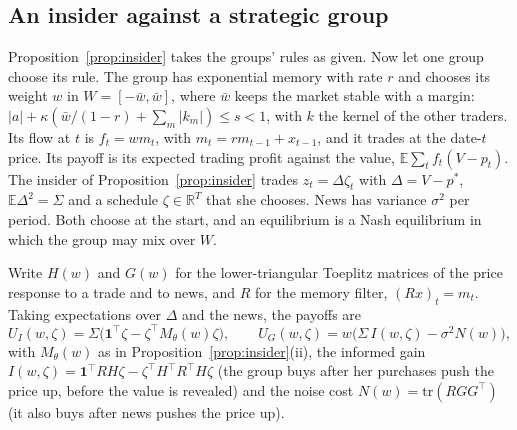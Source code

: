 \documentclass[12pt]{article}
\theoremstyle{definition}
\theoremstyle{remark}
\begin{document}
\subsection{An insider against a strategic group}

Proposition~\ref{prop:insider} takes the groups' rules as given. Now let one group choose its rule. The group has exponential memory with rate $r$ and chooses its weight $w$ in $W=[-\bar w,\bar w]$, where $\bar w$ keeps the market stable with a margin: $|a|+\kappa(\bar w/(1-r)+\sum_m|k_m|)\le s<1$, with $k$ the kernel of the other traders. Its flow at $t$ is $f_t=wm_t$, with $m_t=rm_{t-1}+x_{t-1}$, and it trades at the date-$t$ price. Its payoff is its expected trading profit against the value, $\mathbb E\sum_tf_t(V-p_t)$. The insider of Proposition~\ref{prop:insider} trades $z_t=\Delta\zeta_t$ with $\Delta=V-p^*$, $\mathbb E\Delta^2=\Sigma$ and a schedule $\zeta\in\mathbb R^T$ that she chooses. News has variance $\sigma^2$ per period. Both choose at the start, and an equilibrium is a Nash equilibrium in which the group may mix over $W$.

Write $H(w)$ and $G(w)$ for the lower-triangular Toeplitz matrices of the price response to a trade and to news, and $R$ for the memory filter, $(R x)_t=m_t$. Taking expectations over $\Delta$ and the news, the payoffs are
\[
U_I(w,\zeta)=\Sigma\bigl(\mathbf 1^\top\zeta-\zeta^\top M_\theta(w)\zeta\bigr),\qquad
U_G(w,\zeta)=w\bigl(\Sigma\,I(w,\zeta)-\sigma^2N(w)\bigr),
\]
with $M_\theta(w)$ as in Proposition~\ref{prop:insider}(ii), the informed gain $I(w,\zeta)=\mathbf 1^\top RH\zeta-\zeta^\top H^\top R^\top H\zeta$ (the group buys after her purchases push the price up, before the value is revealed) and the noise cost $N(w)=\mathrm{tr}(RGG^\top)$ (it also buys after news pushes the price up).
\end{document}
